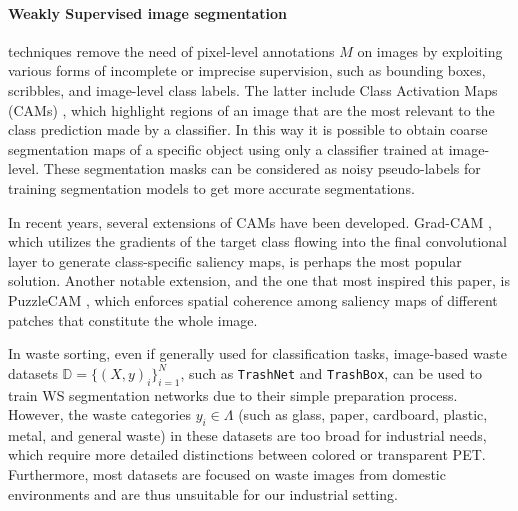 \paragraph{Weakly Supervised image segmentation} techniques remove the need of pixel-level annotations $M$ on images by exploiting various forms of incomplete or imprecise supervision, such as bounding boxes\cite{dai2015boxsup, papandreou2015weakly, khoreva2017simple, song2019box}, scribbles\cite{lin2016scribblesup, vernaza2017learning, tang2018normalized}, and image-level class labels\cite{kolesnikov2016seed, jin2017webly, hou2018self, wei2018revisiting, huang2018weakly, lee2019ficklenet, shimoda2019self, sun2020mining}. 
The latter include Class Activation Maps (CAMs) \cite{zhou2016learning}, which highlight regions of an image that are the most relevant to the class prediction made by a classifier. In this way it is possible to obtain coarse segmentation maps of a specific object using only a classifier trained at image-level. These segmentation masks can be considered as noisy pseudo-labels for training segmentation models\cite{sun2020mining, shimoda2019self, kolesnikov2016seed,huang2018weakly} to get more accurate segmentations.

In recent years, several extensions of CAMs have been developed. Grad-CAM \cite{selvaraju2017grad}, which utilizes the gradients of the target class flowing into the final convolutional layer to generate class-specific saliency maps, is perhaps the most popular solution. Another notable extension, and the one that most inspired this paper, is PuzzleCAM \cite{jo2021puzzle}, which enforces spatial coherence among saliency maps of different patches that constitute the whole image.

In waste sorting, even if generally used for classification tasks, image-based waste datasets \( \mathbb{D} = \{(X, y)_i\}_{i=1}^N \), such as \texttt{TrashNet}\cite{yang2016classification} and \texttt{TrashBox}\cite{kumsetty2022trashbox}, can be used to train WS segmentation networks due to their simple preparation process. However, the waste categories \( y_i \in \Lambda \) (such as glass, paper, cardboard, plastic, metal, and general waste) in these datasets are too broad for industrial needs, which require more detailed distinctions between colored or transparent PET. Furthermore, most datasets are focused on waste images from domestic environments and are thus unsuitable for our industrial setting. 

